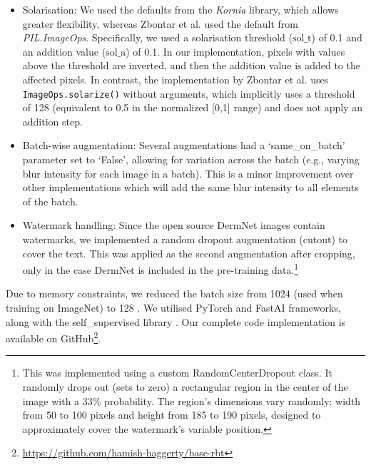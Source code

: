 \documentclass[a4paper,fleqn]{cas-dc}
\begin{document}
\begin{itemize}
\item Solarisation: We used the defaults from the \textit{Kornia} library, which allows greater flexibility, whereas Zbontar et al. \cite{zbontar2021barlow} used the default from \textit{PIL.ImageOps}. Specifically, we used a solarisation threshold ($\textrm{sol\_t}$) of 0.1 and an addition value ($\textrm{sol\_a}$) of 0.1. In our implementation, pixels with values above the threshold are inverted, and then the addition value is added to the affected pixels. In contrast, the implementation by Zbontar et al. uses \texttt{ImageOps.solarize()} without arguments, which implicitly uses a threshold of 128 (equivalent to 0.5 in the normalized [0,1] range) and does not apply an addition step. 

\item Batch-wise augmentation: Several augmentations had a `same\_on\_batch' parameter set to `False', allowing for variation across the batch (e.g., varying blur intensity for each image in a batch). This is a minor improvement over other implementations which will add the same blur intensity to all elements of the batch.
\item Watermark handling: Since the open source DermNet images contain watermarks, we implemented a random dropout augmentation (cutout) to cover the text. This was applied as the second augmentation after cropping, only in the case DermNet is included in the pre-training data.\footnote{This was implemented using a custom RandomCenterDropout class. It randomly drops out (sets to zero) a rectangular region in the center of the image with a 33\% probability. The region's dimensions vary randomly: width from 50 to 100 pixels and height from 185 to 190 pixels, designed to approximately cover the watermark's variable position.}
\end{itemize}

Due to memory constraints, we reduced the batch size from 1024 (used when training on ImageNet) to 128 \cite{zbontar2021barlow}. We utilised PyTorch and FastAI frameworks, along with the self\_supervised library \cite{turgutlu_self_supervised}. Our complete code implementation is available on GitHub\footnote{\url{https://github.com/hamish-haggerty/base-rbt}}.
\end{document}
